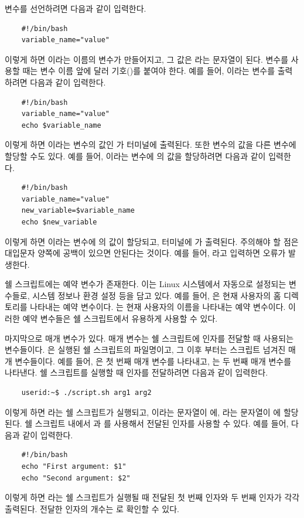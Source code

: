 {변수를 선언하려면 다음과 같이 입력한다.
\begin{lstlisting}
    #!/bin/bash
    variable_name="value"
\end{lstlisting}
이렇게 하면 이라는 이름의 변수가 만들어지고, 그 값은 라는 문자열이 된다. 변수를 사용할 때는 변수 이름 앞에 달러 기호(\code{\$})를 붙여야 한다. 예를 들어, 이라는 변수를 출력하려면 다음과 같이 입력한다.
\begin{lstlisting}
    #!/bin/bash
    variable_name="value"
    echo $variable_name
\end{lstlisting}
이렇게 하면 이라는 변수의 값인 가 터미널에 출력된다. 또한 변수의 값을 다른 변수에 할당할 수도 있다. 예를 들어, 이라는 변수에 의 값을 할당하려면 다음과 같이 입력한다.
\begin{lstlisting}
    #!/bin/bash
    variable_name="value"
    new_variable=$variable_name
    echo $new_variable
\end{lstlisting}
이렇게 하면 이라는 변수에 의 값이 할당되고, 터미널에 가 출력된다. 주의해야 할 점은 대입문자 \code{=} 양쪽에 공백이 있으면 안된다는 것이다. 예를 들어, 라고 입력하면 오류가 발생한다.

쉘 스크립트에는 예약 변수가 존재한다. 이는 Linux 시스템에서 자동으로 설정되는 변수들로, 시스템 정보나 환경 설정 등을 담고 있다. 예를 들어, 은 현재 사용자의 홈 디렉토리를 나타내는 예약 변수이다. 는 현재 사용자의 이름을 나타내는 예약 변수이다. 이러한 예약 변수들은 쉘 스크립트에서 유용하게 사용할 수 있다.

마지막으로 매개 변수가 있다. 매개 변수는 쉘 스크립트에 인자를 전달할 때 사용되는 변수들이다. 은 실행된 쉘 스크립트의 파일명이고, 그 이후 부터는 스크립트 넘겨진 매개 변수들이다. 예를 들어, 은 첫 번째 매개 변수를 나타내고, 는 두 번째 매개 변수를 나타낸다. 쉘 스크립트를 실행할 때 인자를 전달하려면 다음과 같이 입력한다.
\begin{lstlisting}
    userid:~$ ./script.sh arg1 arg2
\end{lstlisting}
이렇게 하면 라는 쉘 스크립트가 실행되고, 이라는 문자열이 에, 라는 문자열이 에 할당된다. 쉘 스크립트 내에서 과 를 사용해서 전달된 인자를 사용할 수 있다. 예를 들어, 다음과 같이 입력한다.
\begin{lstlisting}
    #!/bin/bash
    echo "First argument: $1"
    echo "Second argument: $2"
\end{lstlisting}
이렇게 하면 라는 쉘 스크립트가 실행될 때 전달된 첫 번째 인자와 두 번째 인자가 각각 출력된다. 전달한 인자의 개수는 \code{$#}로 확인할 수 있다.

}
